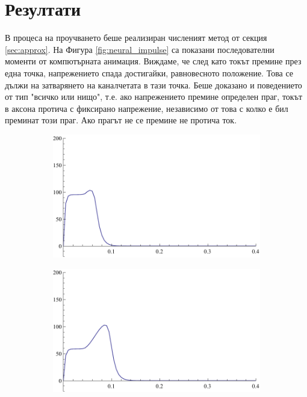 \documentclass{article}
\numberwithin{equation}{section}
\begin{document}
    \section{Резултати}
        
    В процеса на проучването беше реализиран численият метод от секция \ref{sec:approx}. На Фигура \ref{fig:neural_impulse} са показани
    последователни моменти от компютърната анимация. Виждаме, че след като токът премине през една точка, напрежението спада достигайки,
    равновесното положение. Това се дължи на затварянето на каналчетата в тази точка. Беше доказано и поведението от тип "всичко или нищо", 
    т.е. ако напрежението премине определен праг, токът в аксона протича с фиксирано напрежение, независимо от това с колко е бил преминат този
    праг. Ако прагът не се премине не протича ток.
    \begin{figure}[H]
        \centering
        \begin{subfigure}[t]{0.3\textwidth}
            \includegraphics[width=\textwidth]{./schemas/Neuron1.pdf}
        \end{subfigure}
        \begin{subfigure}[t]{0.3\textwidth}
            \includegraphics[width=\textwidth]{./schemas/Neuron2.pdf}

\end{subfigure}
\end{figure}
\end{document}
